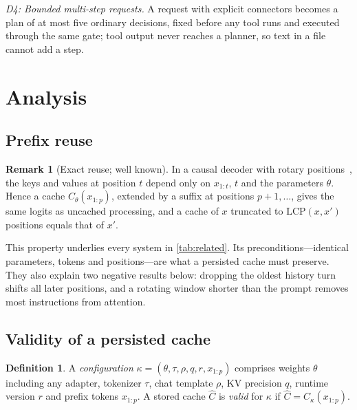 \documentclass[journal]{IEEEtran}
\theoremstyle{definition}
\newtheorem{definition}{Definition}
\newtheorem{remark}{Remark}
\begin{document}
\emph{D4: Bounded multi-step requests.} A request with explicit connectors becomes a plan of at most
five ordinary decisions, fixed before any tool runs and executed through the same gate; tool output
never reaches a planner, so text in a file cannot add a step.

\section{Analysis}\label{sec:theory}

\subsection{Prefix reuse}\label{sec:prefix}

\begin{remark}[Exact reuse; well known]\label{cor:exact}
In a causal decoder with rotary positions~\cite{su2024roformer}, the keys and values at position
$t$ depend only on $x_{1:t}$, $t$ and the parameters $\theta$. Hence a cache $C_\theta(x_{1:p})$,
extended by a suffix at positions $p+1,\dots$, gives the same logits as uncached processing, and a
cache of $x$ truncated to $\mathrm{LCP}(x,x')$ positions equals that of $x'$.
\end{remark}
\noindent This property underlies every system in \cref{tab:related}. Its preconditions---identical
parameters, tokens and positions---are what a persisted cache must preserve. They also explain two
negative results below: dropping the oldest history turn shifts all later positions, and a rotating
window shorter than the prompt removes most instructions from attention.

\subsection{Validity of a persisted cache}\label{sec:validity}

\begin{definition}
A \emph{configuration} $\kappa=(\theta,\tau,\rho,q,r,x_{1:p})$ comprises weights $\theta$ including
any adapter, tokenizer $\tau$, chat template $\rho$, KV precision $q$, runtime version $r$ and
prefix tokens $x_{1:p}$. A stored cache $\hat C$ is \emph{valid} for $\kappa$ if
$\hat C=C_\kappa(x_{1:p})$.
\end{definition}
\end{document}
